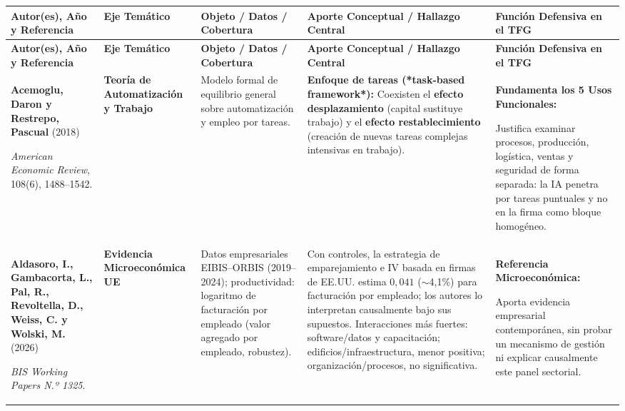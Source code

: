 \documentclass[10pt,a4paper,landscape]{article}
\begin{document}
\renewcommand{\arraystretch}{1.20}
\small
\begin{xltabular}{\textwidth}{@{} L{4.5cm} L{3.3cm} Y Y Y @{}}
  \toprule
  \color{white}\textbf{Autor(es), Año y Referencia} & 
  \color{white}\textbf{Eje Temático} & 
  \color{white}\textbf{Objeto / Datos / Cobertura} & 
  \color{white}\textbf{Aporte Conceptual / Hallazgo Central} & 
  \color{white}\textbf{Función Defensiva en el TFG} \\
  \midrule
  \endfirsthead

  \toprule
  \color{white}\textbf{Autor(es), Año y Referencia} & 
  \color{white}\textbf{Eje Temático} & 
  \color{white}\textbf{Objeto / Datos / Cobertura} & 
  \color{white}\textbf{Aporte Conceptual / Hallazgo Central} & 
  \color{white}\textbf{Función Defensiva en el TFG} \\
  \midrule
  \endhead

  \bottomrule
  \endfoot

  \textbf{Acemoglu, Daron y Restrepo, Pascual} (2018)\par
  \textit{American Economic Review}, 108(6), 1488--1542.\par
  [\texttt{acemoglu2018race}] &
  \textbf{Teoría de Automatización y Trabajo} &
  Modelo formal de equilibrio general sobre automatización y empleo por tareas. &
  \textbf{Enfoque de tareas (*task-based framework*):} Coexisten el \textbf{efecto desplazamiento} (capital sustituye trabajo) y el \textbf{efecto restablecimiento} (creación de nuevas tareas complejas intensivas en trabajo). &
  \textbf{Fundamenta los 5 Usos Funcionales:}\par
  Justifica examinar procesos, producción, logística, ventas y seguridad de forma separada: la IA penetra por tareas puntuales y no en la firma como bloque homogéneo. \\
  \textbf{Aldasoro, I., Gambacorta, L., Pal, R., Revoltella, D., Weiss, C. y Wolski, M.} (2026)\par
  \textit{BIS Working Papers N.º 1325}.\par
  [\texttt{aldasoro2026adoption}] &
  \textbf{Evidencia Microeconómica UE} &
  Datos empresariales EIBIS--ORBIS (2019--2024); productividad: logaritmo de facturación por empleado (valor agregado por empleado, robustez). &
  Con controles, la estrategia de emparejamiento e IV basada en firmas de EE.UU. estima $0,041$ ($\sim$4,1\%) para facturación por empleado; los autores lo interpretan causalmente bajo sus supuestos. Interacciones más fuertes: software/datos y capacitación; edificios/infraestructura, menor positiva; organización/procesos, no significativa. &
  \textbf{Referencia Microeconómica:}\par
  Aporta evidencia empresarial contemporánea, sin probar un mecanismo de gestión ni explicar causalmente este panel sectorial. \\


\end{xltabular}
\end{document}
